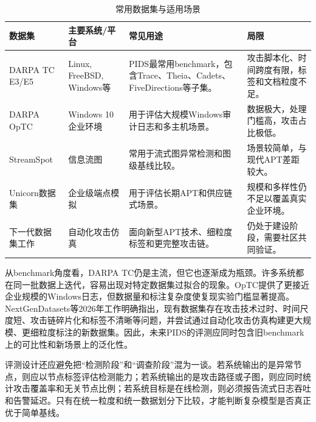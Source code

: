 \begin{table}[htbp]
    \centering
    \small
    \caption{常用数据集与适用场景}
    \label{tab:datasets}
    \renewcommand{\arraystretch}{1.18}
    \begin{tabularx}{\textwidth}{p{2.6cm} p{2.4cm} X X}
        \toprule
        数据集 & 主要系统/平台 & 常见用途 & 局限 \\
        \midrule
        DARPA TC E3/E5 & Linux, FreeBSD, Windows等 & PIDS最常用benchmark，包含Trace、Theia、Cadets、FiveDirections等子集。 & 攻击脚本化、时间跨度有限，标签和文档粒度不足。 \\
        DARPA OpTC & Windows 10企业环境 & 用于评估大规模Windows审计日志和多主机场景。 & 数据极大，处理门槛高，攻击占比极低。 \\
        StreamSpot & 信息流图 & 常用于流式图异常检测和图级基线比较。 & 场景较简单，与现代APT差距较大。 \\
        Unicorn数据集 & 企业级端点模拟 & 用于评估长期APT和供应链式场景。 & 规模和多样性仍不足以覆盖真实企业环境。 \\
        下一代数据集工作\citep{nextgendatasets2026} & 自动化攻击仿真 & 面向新型APT技术、细粒度标签和更完整攻击链。 & 仍处于建设阶段，需要社区共同验证。 \\
        \bottomrule
    \end{tabularx}
\end{table}

从benchmark角度看，DARPA TC仍是主流，但它也逐渐成为瓶颈。许多系统都在同一批数据上迭代，容易出现对特定数据集过拟合的现象。OpTC提供了更接近企业规模的Windows日志，但数据量和标注复杂度使复现实验门槛显著提高。NextGenDatasets等2026年工作明确指出，现有数据集存在攻击技术过时、时间尺度短、攻击链碎片化和标签不清晰等问题，并尝试通过自动化攻击仿真构建更大规模、更细粒度标注的新数据集\citep{nextgendatasets2026}。因此，未来PIDS的评测应同时包含旧benchmark上的可比性和新场景上的泛化性。

评测设计还应避免把“检测阶段”和“调查阶段”混为一谈。若系统输出的是异常节点，则应以节点标签评估检测能力；若系统输出的是攻击路径或子图，则应同时统计攻击覆盖率和无关节点比例；若系统目标是在线检测，则必须报告流式日志吞吐和告警延迟。只有在统一粒度和统一数据划分下比较，才能判断复杂模型是否真正优于简单基线。
